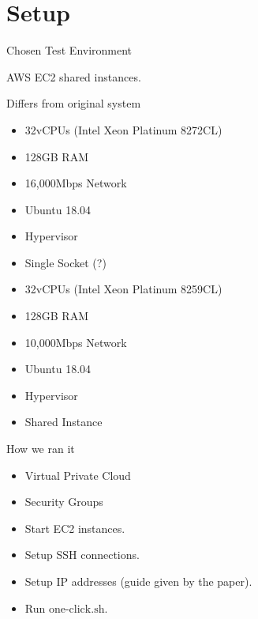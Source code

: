 \documentclass[notes, xcolor=dvipsnames]{beamer}
\begin{document}
    

    \section{Setup}

    
    \begin{frame}{Chosen Test Environment}

        AWS EC2 shared instances. 

        Differs from original system
        \begin{multicols}{2}
            \begin{itemize}
                \item 32vCPUs (Intel Xeon Platinum 8272CL) 
                \item 128GB RAM 
                \item 16,000Mbps Network
                \item Ubuntu 18.04 
                \item Hypervisor
                \item Single Socket (?)
                \item 32vCPUs (Intel Xeon Platinum 8259CL) 
                \item 128GB RAM
                \item 10,000Mbps Network 
                \item Ubuntu 18.04 
                \item Hypervisor
                \item Shared Instance
            \end{itemize}      
        \end{multicols}
    \end{frame}


    \begin{frame}{How we ran it}

        \begin{itemize}
            \item Virtual Private Cloud 
            \item Security Groups 
            \item Start EC2 instances.
            \item Setup SSH connections. 
            \item Setup IP addresses (guide given by the paper).
            \item Run $\text{one-click}.\text{sh}$.
        \end{itemize}

    \end{frame}
\end{document}
